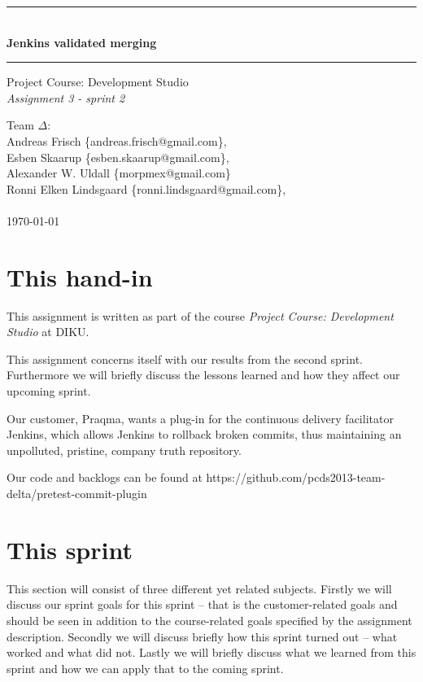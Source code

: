 \documentclass[a4paper]{article}
\makeatletter
\newcommand{\systemname}{Jenkins validated merging}
\newcommand{\groupname}{Team $\Delta$}
\newcommand{\groupmembers}{
	Andreas Frisch \{andreas.frisch@gmail.com\}, \\
	Esben Skaarup \{esben.skaarup@gmail.com\}, \\
	Alexander W. Uldall \{morpmex@gmail.com\} \\
	Ronni Elken Lindsgaard \{ronni.lindsgaard@gmail.com\}, \\
	~
}
\makeatother
\begin{document}
\begin{titlepage}
	\begin{center}
		\vspace*{4cm}
		\rule{\linewidth}{0.5mm}\\[0.4cm]
		{\huge \bfseries \systemname}
		\rule{\linewidth}{0.5mm}
	\end{center}
	\begin{flushleft}
		{
			\Large Project Course: Development Studio \\[0.1cm]
			{\it Assignment 3 - sprint 2}
		}
	\end{flushleft}
	\vspace*{4cm}
	
	\begin{flushleft}
		{\Large \groupname :} \\[0.1cm]
		{\Large \groupmembers} \\[0.3cm]
		{\Large \today}
	\end{flushleft}
\end{titlepage}
\newpage
\onehalfspacing
\setcounter{tocdepth}{2}

\section{This hand-in}
This assignment is written as part of the course {\it Project Course: Development Studio} at DIKU.

This assignment concerns itself with our results from the second sprint.
Furthermore we will briefly discuss the lessons learned and how they affect our
upcoming sprint.

Our customer, Praqma, wants a plug-in for the continuous delivery facilitator
Jenkins, which allows Jenkins to rollback broken commits, thus maintaining an
unpolluted, pristine, company truth repository.

Our code and backlogs can be found at https://github.com/pcds2013-team-delta/pretest-commit-plugin

\section{This sprint}
This section will consist of three different yet related subjects. Firstly we
will discuss our sprint goals for this sprint -- that is the customer-related
goals and should be seen in addition to the course-related goals specified by
the assignment description. Secondly we will discuss briefly how this sprint
turned out -- what worked and what did not. Lastly we will briefly discuss what
we learned from this sprint and how we can apply that to the coming sprint.
\end{document}
